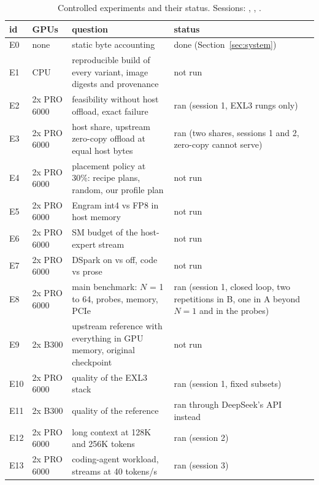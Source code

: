 \begin{table}[h]
\centering\small
\begin{tabular}{llp{6.2cm}p{3.6cm}}
\toprule
id & GPUs & question & status \\
\midrule
E0 & none & static byte accounting & done (Section~\ref{sec:system}) \\
E1 & CPU & reproducible build of every variant, image digests and provenance & not run \\
E2 & 2x PRO 6000 & feasibility without host offload, exact failure & ran (session 1, EXL3 rungs only) \\
E3 & 2x PRO 6000 & host share, upstream zero-copy offload at equal host bytes & ran (two shares, sessions 1 and 2, zero-copy cannot serve) \\
E4 & 2x PRO 6000 & placement policy at 30\%: recipe plans, random, our profile plan & not run \\
E5 & 2x PRO 6000 & Engram int4 vs FP8 in host memory & not run \\
E6 & 2x PRO 6000 & SM budget of the host-expert stream & not run \\
E7 & 2x PRO 6000 & DSpark on vs off, code vs prose & not run \\
E8 & 2x PRO 6000 & main benchmark: $N$ = 1 to 64, probes, memory, PCIe & ran (session 1, closed loop, two repetitions in B, one in A beyond $N=1$ and in the probes) \\
E9 & 2x B300 & upstream reference with everything in GPU memory, original checkpoint & not run \\
E10 & 2x PRO 6000 & quality of the EXL3 stack & ran (session 1, fixed subsets) \\
E11 & 2x B300 & quality of the reference & ran through DeepSeek's API instead \\
E12 & 2x PRO 6000 & long context at 128K and 256K tokens & ran (session 2) \\
E13 & 2x PRO 6000 & coding-agent workload, streams at 40 tokens/s & ran (session 3) \\
\bottomrule
\end{tabular}
\caption{Controlled experiments and their status. Sessions: ,
, .}
\label{tab:plan}
\end{table}
